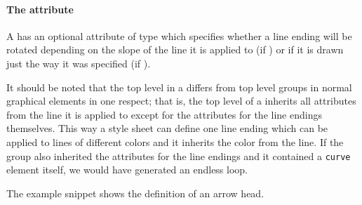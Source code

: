 \paragraph{The \fixttspace{} attribute}

A \LineEnding has an optional attribute 
of type  which specifies whether a line ending
will be rotated depending on the slope of the line it is applied to (if ) or if it is
drawn just the way it was specified (if ).


It should be noted that the top level \RenderGroup in a \LineEnding differs from top level groups in normal graphical elements in one respect; that is, the top level \RenderGroup of a \LineEnding inherits all attributes from the line it is applied to except for the attributes for the line endings themselves. This way a style sheet can define one line ending which can be applied to lines of different colors and it inherits the color from the line.
If the group also inherited the attributes for the line endings and it contained a \texttt{curve} element itself, we would have generated an endless loop.

The example snippet shows the definition of an arrow head.
\pagebreak
{}



